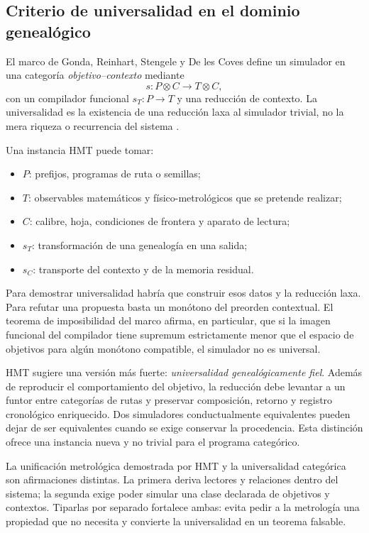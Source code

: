 \subsection{Criterio de universalidad en el dominio genealógico}

El marco de Gonda, Reinhart, Stengele y De les Coves define un simulador en
una categoría \emph{objetivo--contexto} mediante
\[
 s:P\otimes C\longrightarrow T\otimes C,
 \tag{GMC-8.5}
\]
con un compilador funcional $s_T:P\to T$ y una reducción de contexto. La
universalidad es la existencia de una reducción laxa al simulador trivial,
no la mera riqueza o recurrencia del sistema
\citep{gonda2024universality}.

Una instancia HMT puede tomar:

\begin{itemize}
 \item $P$: prefijos, programas de ruta o semillas;
 \item $T$: observables matemáticos y físico-metrológicos que se pretende
 realizar;
 \item $C$: calibre, hoja, condiciones de frontera y aparato de lectura;
\item $s_T$: transformación de una genealogía en una salida;
 \item $s_C$: transporte del contexto y de la memoria residual.
\end{itemize}

Para demostrar universalidad habría que construir esos datos y la reducción
laxa. Para refutar una propuesta basta un monótono del preorden contextual.
El teorema de imposibilidad del marco afirma, en particular, que si la imagen
funcional del compilador tiene supremum estrictamente menor que el espacio de
objetivos para algún monótono compatible, el simulador no es universal.

\begin{bridgebox}
HMT sugiere una versión más fuerte: \emph{universalidad genealógicamente
fiel}. Además de reproducir el comportamiento del objetivo, la reducción debe
levantar a un funtor entre categorías de rutas y preservar composición,
retorno y registro cronológico enriquecido. Dos simuladores conductualmente equivalentes pueden dejar
de ser equivalentes cuando se exige conservar la procedencia. Esta distinción
ofrece una instancia nueva y no trivial para el programa categórico.
\end{bridgebox}

La unificación metrológica demostrada por HMT y la universalidad categórica
son afirmaciones distintas. La primera deriva lectores y relaciones dentro
del sistema; la segunda exige poder simular una clase declarada de objetivos y
contextos. Tiparlas por separado fortalece ambas: evita pedir a la metrología
una propiedad que no necesita y convierte la universalidad en un teorema
falsable.

